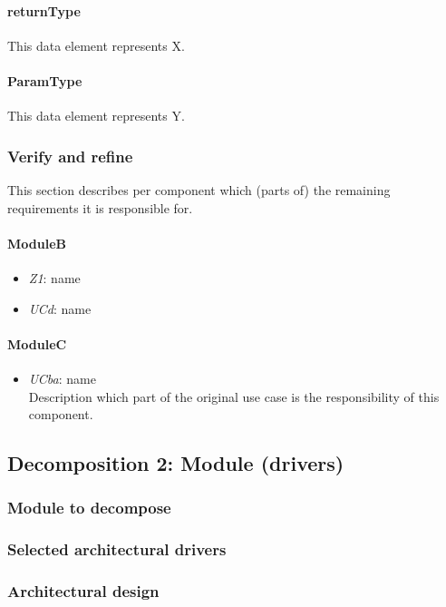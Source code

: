 \documentclass[a4paper,10pt]{article}
\begin{document}
\paragraph{returnType} This data element represents X.

\paragraph{ParamType} This data element represents Y.

\subsubsection{Verify and refine}
This section describes per component which (parts of) the remaining
requirements it is responsible for.

\paragraph{ModuleB}
\begin{itemize}
    \item \emph{Z1}: name
    \item \emph{UCd}: name
\end{itemize}

\paragraph{ModuleC}
\begin{itemize}
    \item \emph{UCba}: name\\Description which part of the original use case is
        the responsibility of this component.
\end{itemize}

\subsection{Decomposition 2: Module (drivers)}
\subsubsection{Module to decompose}
\subsubsection{Selected architectural drivers}
\subsubsection{Architectural design}
\end{document}
